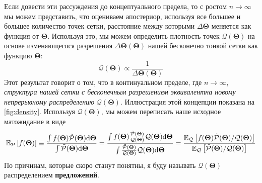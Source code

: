 \documentclass[12pt, titlepage]{article}
\newcommand{\deriv}{\ensuremath{{\rm d}}}  %
\newcommand{\meanwrt}[2]{\ensuremath{\mathbb{E}_{{#2}}\left[{#1}\right]}}
\newcommand{\params}{\ensuremath{\boldsymbol\Theta}}
\newcommand{\posterior}{\ensuremath{\mathcal{P}}}
\newcommand{\proposal}{\ensuremath{\mathcal{Q}}}
\begin{document}
Если довести эти рассуждения до концептуального предела, то с ростом $n \rightarrow \infty$ мы можем представить, что оцениваем апостериор, используя все большее и большее количество точек сетки, расстояние между которыми $\Delta \params$ меняется как функция от $\params$. Используя это, мы можем определить плотность точек $\proposal(\params)$ на основе изменяющегося разрешения $\Delta\params(\params)$ нашей бесконечно тонкой сетки как функцию $\params$: 
\begin{equation} 
	\proposal(\params)\propto \frac{1}{\Delta\params (\params)} 
\end{equation} 
Этот результат говорит о том, что в континуальном пределе, где $n \rightarrow \infty$, \textit{структура нашей сетки с бесконечным разрешением эквивалентна новому непрерывному распределению} $\proposal(\params)$. Иллюстрация этой концепции показана на {\color{red} \autoref{fig:density}}. Используя $\proposal(\params)$, мы можем переписать наше исходное матожидание в виде
\begin{equation}
    \meanwrt{f(\params)}{\posterior} 
    \equiv \frac{\int f(\params) \tilde{\posterior}(\params) \deriv \params}
    {\int \tilde{\posterior}(\params) \deriv \params}
    = \frac{\int f(\params) \frac{\tilde{\posterior}(\params)}{\proposal(\params)}
    \proposal(\params) \deriv \params}
    {\int \frac{\tilde{\posterior}(\params)}{\proposal(\params)}
    \proposal(\params) \deriv \params}
    = \frac{\meanwrt{f(\params) 
    \tilde{\posterior}(\params)/\proposal(\params)}{\proposal}}
    {\meanwrt{\tilde{\posterior}(\params)/\proposal(\params)}{\proposal}}
\end{equation}
По причинам, которые скоро станут понятны, я буду называть $\proposal(\params)$ распределением \textbf{предложений}.
\end{document}
